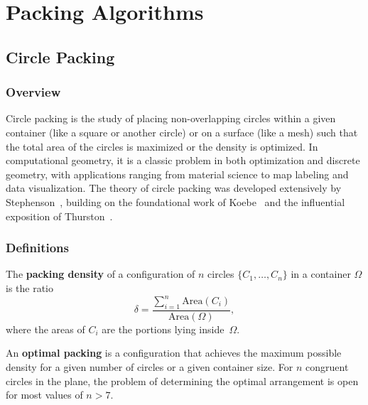 \chapter{Packing Algorithms}
\label{ch:packing_algorithms}

\section{Circle Packing}
\label{sec:circle_packing}

\subsection{Overview}
Circle packing is the study of placing non-overlapping circles within a given container (like a square or another circle) or on a surface (like a mesh) such that the total area of the circles is maximized or the density is optimized. In computational geometry, it is a classic problem in both optimization and discrete geometry, with applications ranging from material science to map labeling and data visualization. The theory of circle packing was developed extensively by Stephenson~\cite{stephenson2005}, building on the foundational work of Koebe~\cite{koebe1936} and the influential exposition of Thurston~\cite{thurston1985}.

\subsection{Definitions}

\begin{definition}\label{def:packing_density}
The \textbf{packing density} of a configuration of $n$ circles $\{C_1, \dots, C_n\}$ in a container $\Omega$ is the ratio
\[
\delta = \frac{\sum_{i=1}^{n} \text{Area}(C_i)}{\text{Area}(\Omega)},
\]
where the areas of $C_i$ are the portions lying inside~$\Omega$.
\end{definition}

\begin{definition}\label{def:optimal_packing}
An \textbf{optimal packing} is a configuration that achieves the maximum possible density for a given number of circles or a given container size. For $n$ congruent circles in the plane, the problem of determining the optimal arrangement is open for most values of $n > 7$.
\end{definition}

